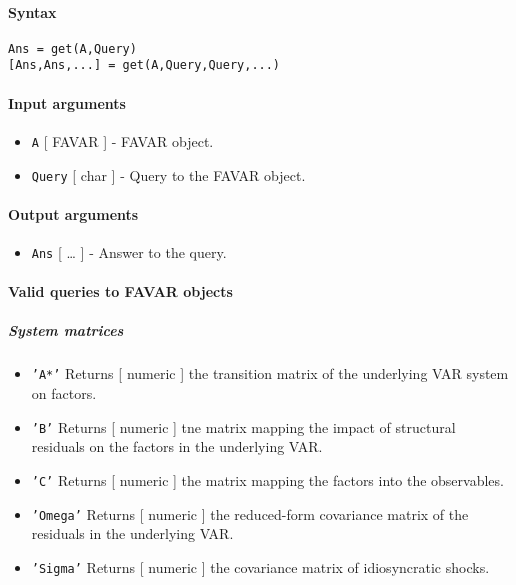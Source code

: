 


	\paragraph{Syntax}\label{syntax}

\begin{verbatim}
Ans = get(A,Query)
[Ans,Ans,...] = get(A,Query,Query,...)
\end{verbatim}

\paragraph{Input arguments}\label{input-arguments}

\begin{itemize}
\item
  \texttt{A} {[} FAVAR {]} - FAVAR object.
\item
  \texttt{Query} {[} char {]} - Query to the FAVAR object.
\end{itemize}

\paragraph{Output arguments}\label{output-arguments}

\begin{itemize}
\itemsep1pt\parskip0pt
\item
  \texttt{Ans} {[} \ldots{} {]} - Answer to the query.
\end{itemize}

\paragraph{Valid queries to FAVAR
objects}\label{valid-queries-to-favar-objects}

\subparagraph{System matrices}\label{system-matrices}

\begin{itemize}
\item
  \texttt{'A*'} Returns {[} numeric {]} the transition matrix of the
  underlying VAR system on factors.
\item
  \texttt{'B'} Returns {[} numeric {]} tne matrix mapping the impact of
  structural residuals on the factors in the underlying VAR.
\item
  \texttt{'C'} Returns {[} numeric {]} the matrix mapping the factors
  into the observables.
\item
  \texttt{'Omega'} Returns {[} numeric {]} the reduced-form covariance
  matrix of the residuals in the underlying VAR.
\item
  \texttt{'Sigma'} Returns {[} numeric {]} the covariance matrix of
  idiosyncratic shocks.
\end{itemize}

